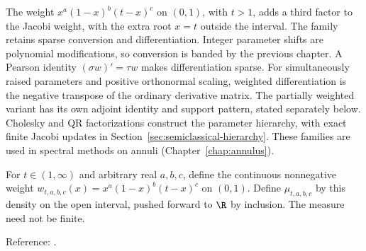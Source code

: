 The weight $x^a(1-x)^b(t-x)^c$ on $(0,1)$, with $t>1$, adds a third factor to
the Jacobi weight, with the extra root $x=t$ outside the interval. The family
retains sparse conversion and differentiation.
Integer parameter shifts are polynomial modifications, so conversion is banded
by the previous chapter. A Pearson identity $(\sigma w)'=\tau w$ makes
differentiation sparse. For simultaneously raised parameters and positive
orthonormal scaling, weighted differentiation is the negative transpose of the
ordinary derivative matrix. The partially weighted variant has its own
adjoint identity and support pattern, stated separately below.
Cholesky and QR factorizations construct the parameter hierarchy, with exact
finite Jacobi updates in Section~\ref{sec:semiclassical-hierarchy}.
These families are used in spectral methods on annuli (Chapter~\ref{chap:annulus}).

\begin{definition}
\label{def:semiclassical-jacobi-measure}
\leanok
For $t\in(1,\infty)$ and arbitrary real $a,b,c$, define the continuous
nonnegative weight $w_{t,a,b,c}(x)=x^a(1-x)^b(t-x)^c$ on $(0,1)$.
Define $\mu_{t,a,b,c}$ by this density on the open interval, pushed forward
to $\R$ by inclusion. The measure need not be finite.

Reference: \cite[Section 3]{pgso}.
\end{definition}



